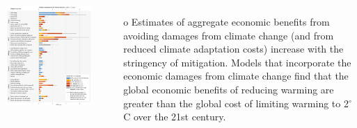 \begin{frame}
  \begin{scriptsize}

    \vspace{-0.1cm}
    \begin{columns}
      \begin{center}
          \includegraphics[width=1.0\textwidth]{plots/WG3_mitigation_options.png}
      \end{center}   

      \begin{itemize}\setlength\itemsep{1.9ex}        

        \item[o] Estimates of aggregate economic benefits from avoiding damages from climate change (and from reduced climate adaptation costs) increase with the stringency of mitigation. Models that incorporate the economic damages from climate change find that the global economic benefits of reducing warming are greater than the global cost of limiting warming to 2$^\circ$C over the 21st century.


\end{itemize}
\end{columns}
\end{scriptsize}
\end{frame}
